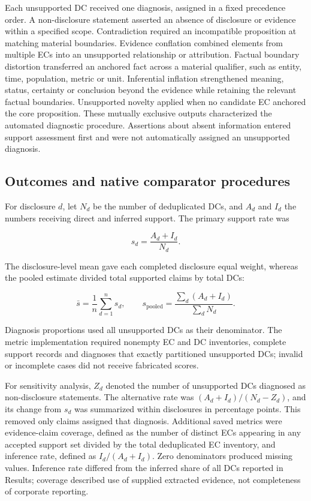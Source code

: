 \documentclass[11pt,a4paper]{article}
\begin{document}
Each unsupported DC received one diagnosis, assigned in a fixed precedence order. A non-disclosure statement asserted an absence of disclosure or evidence within a specified scope. Contradiction required an incompatible proposition at matching material boundaries. Evidence conflation combined elements from multiple ECs into an unsupported relationship or attribution. Factual boundary distortion transferred an anchored fact across a material qualifier, such as entity, time, population, metric or unit. Inferential inflation strengthened meaning, status, certainty or conclusion beyond the evidence while retaining the relevant factual boundaries. Unsupported novelty applied when no candidate EC anchored the core proposition. These mutually exclusive outputs characterized the automated diagnostic procedure. Assertions about absent information entered support assessment first and were not automatically assigned an unsupported diagnosis.

\subsection*{Outcomes and native comparator procedures}

For disclosure \(d\), let \(N_d\) be the number of deduplicated DCs, and \(A_d\) and \(I_d\) the numbers receiving direct and inferred support. The primary support rate was

\[
s_d=\frac{A_d+I_d}{N_d}.
\]

The disclosure-level mean gave each completed disclosure equal weight, whereas the pooled estimate divided total supported claims by total DCs:

\[
\bar{s}=\frac{1}{n}\sum_{d=1}^{n}s_d,
\qquad
s_{\mathrm{pooled}}=\frac{\sum_d(A_d+I_d)}{\sum_d N_d}.
\]

Diagnosis proportions used all unsupported DCs as their denominator. The metric implementation required nonempty EC and DC inventories, complete support records and diagnoses that exactly partitioned unsupported DCs; invalid or incomplete cases did not receive fabricated scores.

For sensitivity analysis, \(Z_d\) denoted the number of unsupported DCs diagnosed as non-disclosure statements. The alternative rate was \((A_d+I_d)/(N_d-Z_d)\), and its change from \(s_d\) was summarized within disclosures in percentage points. This removed only claims assigned that diagnosis. Additional saved metrics were evidence-claim coverage, defined as the number of distinct ECs appearing in any accepted support set divided by the total deduplicated EC inventory, and inference rate, defined as \(I_d/(A_d+I_d)\). Zero denominators produced missing values. Inference rate differed from the inferred share of all DCs reported in Results; coverage described use of supplied extracted evidence, not completeness of corporate reporting.
\end{document}

